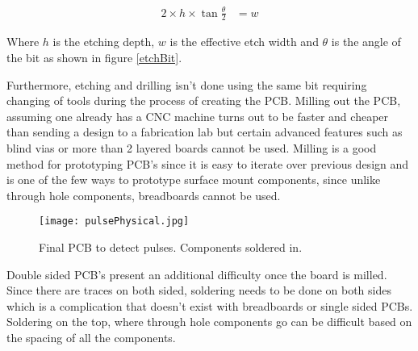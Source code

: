 \documentclass[oneside]{article}
\begin{document}
          \begin{align}
            2\times h \times \tan \frac{\theta}{2} &= w
            \label{etchEquation}
          \end{align}

          Where $h$ is the etching depth, $w$ is the effective etch width and $\theta$ is the angle of the bit as shown in figure \ref{etchBit}.

          Furthermore, etching and drilling isn't done using the same bit requiring changing of tools during the process of creating the PCB. Milling out the PCB, assuming one already has a CNC machine turns out to be faster and cheaper than sending a design to a fabrication lab but certain advanced features such as blind vias or more than 2 layered boards cannot be used. Milling is a good method for prototyping PCB's since it is easy to iterate over previous design and is one of the few ways to prototype surface mount components, since unlike through hole components, breadboards cannot be used.

          \begin{figure}[H]
              \centering
              \texttt{[image: pulsePhysical.jpg]}
              \caption{Final PCB to detect pulses. Components soldered in.}
              \label{pulsePhysical}
          \end{figure}

          Double sided PCB's present an additional difficulty once the board is milled. Since there are traces on both sided, soldering needs to be done on both sides which is a complication that doesn't exist with breadboards or single sided PCBs. Soldering on the top, where through hole components go can be difficult based on the spacing of all the components.
\end{document}
